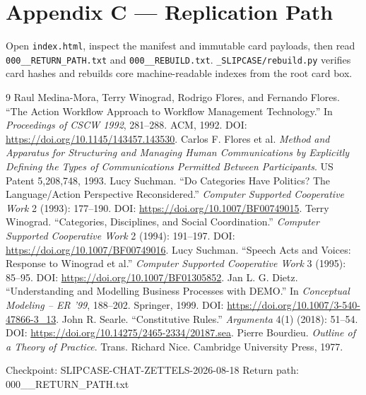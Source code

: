 \documentclass[11pt]{article}
\begin{document}
\section*{Appendix C — Replication Path}

Open \texttt{index.html}, inspect the manifest and immutable card payloads, then read \texttt{000\_\_RETURN\_PATH.txt} and \texttt{000\_\_REBUILD.txt}. \texttt{\_SLIPCASE/rebuild.py} verifies card hashes and rebuilds core machine-readable indexes from the root card box.\par
\begin{thebibliography}{9}
 Raul Medina-Mora, Terry Winograd, Rodrigo Flores, and Fernando Flores. ``The Action Workflow Approach to Workflow Management Technology.'' In \textit{Proceedings of CSCW 1992}, 281--288. ACM, 1992. DOI: \url{https://doi.org/10.1145/143457.143530}.
 Carlos F. Flores et al. \textit{Method and Apparatus for Structuring and Managing Human Communications by Explicitly Defining the Types of Communications Permitted Between Participants}. US Patent 5,208,748, 1993.
 Lucy Suchman. ``Do Categories Have Politics? The Language/Action Perspective Reconsidered.'' \textit{Computer Supported Cooperative Work} 2 (1993): 177--190. DOI: \url{https://doi.org/10.1007/BF00749015}.
 Terry Winograd. ``Categories, Disciplines, and Social Coordination.'' \textit{Computer Supported Cooperative Work} 2 (1994): 191--197. DOI: \url{https://doi.org/10.1007/BF00749016}.
 Lucy Suchman. ``Speech Acts and Voices: Response to Winograd et al.'' \textit{Computer Supported Cooperative Work} 3 (1995): 85--95. DOI: \url{https://doi.org/10.1007/BF01305852}.
 Jan L. G. Dietz. ``Understanding and Modelling Business Processes with DEMO.'' In \textit{Conceptual Modeling -- ER '99}, 188--202. Springer, 1999. DOI: \url{https://doi.org/10.1007/3-540-47866-3_13}.
 John R. Searle. ``Constitutive Rules.'' \textit{Argumenta} 4(1) (2018): 51--54. DOI: \url{https://doi.org/10.14275/2465-2334/20187.sea}.
 Pierre Bourdieu. \textit{Outline of a Theory of Practice}. Trans. Richard Nice. Cambridge University Press, 1977.
\end{thebibliography}
\vfill\noindent\footnotesize Checkpoint: SLIPCASE-CHAT-ZETTELS-2026-08-18 \quad Return path: 000\_\_RETURN\_PATH.txt
\end{document}
